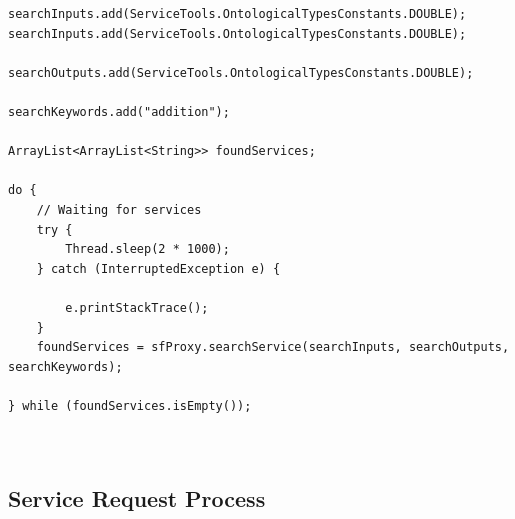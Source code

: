 \begin{itemize}
\begin{lstlisting}
searchInputs.add(ServiceTools.OntologicalTypesConstants.DOUBLE);
searchInputs.add(ServiceTools.OntologicalTypesConstants.DOUBLE);

searchOutputs.add(ServiceTools.OntologicalTypesConstants.DOUBLE);

searchKeywords.add("addition");

ArrayList<ArrayList<String>> foundServices;

do {
	// Waiting for services
	try {
		Thread.sleep(2 * 1000);
	} catch (InterruptedException e) {

		e.printStackTrace();
	}
	foundServices = sfProxy.searchService(searchInputs, searchOutputs, searchKeywords);

} while (foundServices.isEmpty());



\end{lstlisting}
\end{itemize}


\subsection{Service Request Process}
\label{sec:serviceRequestProcess}

